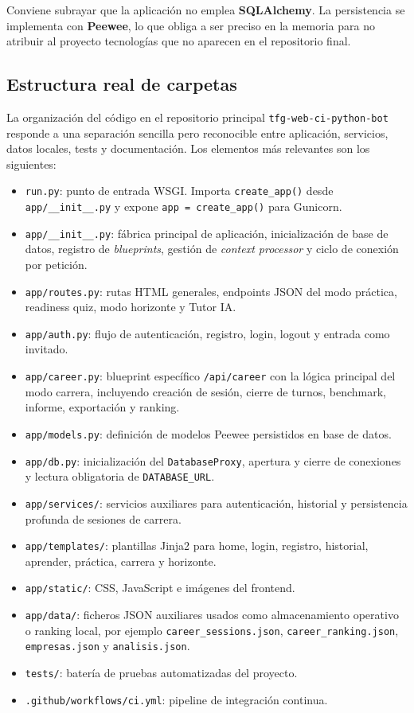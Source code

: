 Conviene subrayar que la aplicación no emplea \textbf{SQLAlchemy}. La persistencia se implementa con \textbf{Peewee}, lo que obliga a ser preciso en la memoria para no atribuir al proyecto tecnologías que no aparecen en el repositorio final.

\subsection{Estructura real de carpetas}

La organización del código en el repositorio principal \texttt{tfg-web-ci-python-bot} responde a una separación sencilla pero reconocible entre aplicación, servicios, datos locales, tests y documentación. Los elementos más relevantes son los siguientes:

\begin{itemize}
    \item \texttt{run.py}: punto de entrada WSGI. Importa \texttt{create\_app()} desde \texttt{app/\_\_init\_\_.py} y expone \texttt{app = create\_app()} para Gunicorn.
    \item \texttt{app/\_\_init\_\_.py}: fábrica principal de aplicación, inicialización de base de datos, registro de \textit{blueprints}, gestión de \textit{context processor} y ciclo de conexión por petición.
    \item \texttt{app/routes.py}: rutas HTML generales, endpoints JSON del modo práctica, readiness quiz, modo horizonte y Tutor IA.
    \item \texttt{app/auth.py}: flujo de autenticación, registro, login, logout y entrada como invitado.
    \item \texttt{app/career.py}: blueprint específico \texttt{/api/career} con la lógica principal del modo carrera, incluyendo creación de sesión, cierre de turnos, benchmark, informe, exportación y ranking.
    \item \texttt{app/models.py}: definición de modelos Peewee persistidos en base de datos.
    \item \texttt{app/db.py}: inicialización del \texttt{DatabaseProxy}, apertura y cierre de conexiones y lectura obligatoria de \texttt{DATABASE\_URL}.
    \item \texttt{app/services/}: servicios auxiliares para autenticación, historial y persistencia profunda de sesiones de carrera.
    \item \texttt{app/templates/}: plantillas Jinja2 para home, login, registro, historial, aprender, práctica, carrera y horizonte.
    \item \texttt{app/static/}: CSS, JavaScript e imágenes del frontend.
    \item \texttt{app/data/}: ficheros JSON auxiliares usados como almacenamiento operativo o ranking local, por ejemplo \texttt{career\_sessions.json}, \texttt{career\_ranking.json}, \texttt{empresas.json} y \texttt{analisis.json}.
    \item \texttt{tests/}: batería de pruebas automatizadas del proyecto.
    \item \texttt{.github/workflows/ci.yml}: pipeline de integración continua.
\end{itemize}

